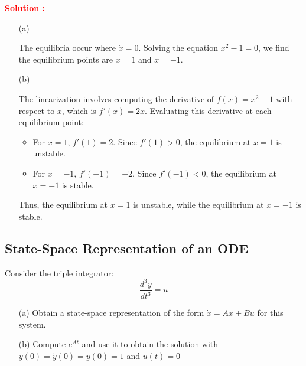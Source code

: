 \documentclass[12pt]{article}
\begin{document}
\textbf{\textcolor{red}{Solution :}}
\begin{enumerate}
\item[(a)] 


The equilibria occur where $\dot{x} = 0$. Solving the equation $x^2 - 1 = 0$, we find the equilibrium points are $x = 1$ and $x = -1$.

\item[(b)] 


The linearization involves computing the derivative of $f(x) = x^2 - 1$ with respect to $x$, which is $f'(x) = 2x$. Evaluating this derivative at each equilibrium point:

\begin{itemize}
    \item For $x = 1$, $f'(1) = 2$. Since $f'(1) > 0$, the equilibrium at $x = 1$ is unstable.
    \item For $x = -1$, $f'(-1) = -2$. Since $f'(-1) < 0$, the equilibrium at $x = -1$ is stable.
\end{itemize}
Thus, the equilibrium at $x = 1$ is unstable, while the equilibrium at $x = -1$ is stable.

\end{enumerate}

\clearpage
\subsection{State-Space Representation of an ODE}


Consider the triple integrator:
\begin{equation}
    \frac{d^3y}{dt^3} = u
\end{equation}
\begin{enumerate}
    \item[(a)] Obtain a state-space representation of the form \(\dot{x} = Ax + Bu\) for this system.

    \item[(b)] Compute \(e^{At}\) and use it to obtain the solution with \(y(0) = \dot{y}(0) = \ddot{y}(0) = 1\) and \(u(t) = 0\)
\end{enumerate}
\end{document}
